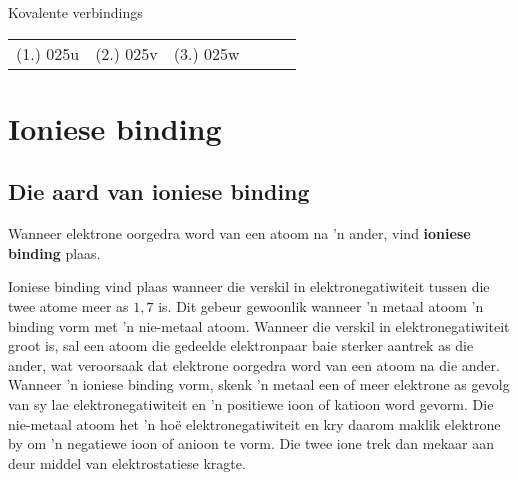 \begin{exercises}{Kovalente verbindings}
{\practiceinfo
 \par \begin{tabular}[h]{cccccc}
 (1.) 025u  &  (2.) 025v  &  (3.) 025w  & \end{tabular}
}
\end{exercises}

         \section{Ioniese binding}
    \nopagebreak


            \subsection*{Die aard van ioniese binding}
            \nopagebreak
        \label{m38684*id142190}Wanneer elektrone oorgedra word van een atoom na 'n ander, vind \textbf{ioniese binding} plaas.\par 
        \label{m38684*id142218}
Ioniese binding vind plaas wanneer die verskil in elektronegatiwiteit tussen die twee atome meer as $1,7$ is. Dit gebeur gewoonlik wanneer 'n metaal atoom  'n binding vorm met 'n nie-metaal atoom. Wanneer die verskil in elektronegatiwiteit groot is, sal een atoom die gedeelde elektronpaar baie sterker aantrek as die ander, wat veroorsaak dat elektrone oorgedra word van een atoom na die ander. Wanneer  'n ioniese binding vorm, skenk  'n metaal een of meer elektrone as gevolg van sy lae elektronegatiwiteit en  'n positiewe ioon of katioon word gevorm. Die nie-metaal atoom het 'n hoë elektronegatiwiteit en kry daarom maklik elektrone by om  'n negatiewe ioon of anioon te vorm. Die twee ione trek dan mekaar aan deur middel van elektrostatiese kragte.\par 


